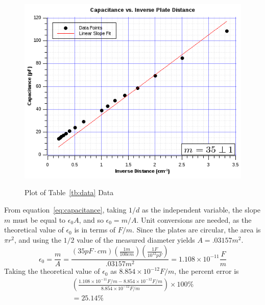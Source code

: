 \documentclass[twocolumn,english]{IEEEtran}
\theoremstyle{plain}
\theoremstyle{plain}
\begin{document}
  \begin{figure}[h!]
  \begin{centering}
  \begin{center}
  \includegraphics[width=\linewidth]{./graph1.png}
  \label{fig:graph1}
  \caption{Plot of Table~\ref{tb:data} Data}
  \end{center}
  \par\end{centering}
  \end{figure}

  From equation~\ref{eq:capacitance}, taking $1/d$ as the independent variable, the slope $m$ must be equal to $\epsilon_0 A$, and so $\epsilon_0 = m/A$. Unit conversions are needed, as the theoretical value of $\epsilon_0$ is in terms of $F/m$. Since the plates are circular, the area is $\pi r^2$, and using the $1/2$ value of the measured diameter yields $A=.03157 m^2$.
  \begin{equation*}
   \epsilon_0 = \frac{m}{A} = \frac{ (35 pF\cdot cm) (\frac{1 m}{100 cm})(\frac{1 F}{10^{12} pF})}{.03157 m^2} = 1.108 \times 10^{-11} \frac{F}{m}
  \end{equation*}
  Taking the theoretical value of $\epsilon_0$ as $8.854\times 10^{-12} F/m$, the percent error is
  \begin{align*}
   \left(\frac{1.108\times 10^{-11} F/m - 8.854\times 10^{-12}F/m}{8.854\times 10^{-12}F/m}\right)\times 100\% \\
   = 25.14\%
  \end{align*}
\end{document}
